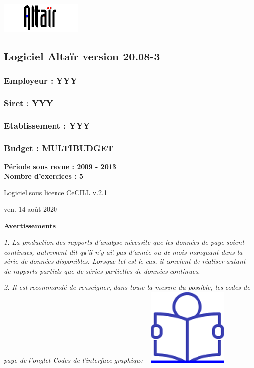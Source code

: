 \includegraphics{icones/altair.png}

\hypertarget{logiciel-altair-version-20.08-3}{%
\subsection{Logiciel Altaïr version
20.08-3}\label{logiciel-altair-version-20.08-3}}

\hypertarget{employeur-yyy}{%
\subsubsection{Employeur : YYY}\label{employeur-yyy}}

\hypertarget{siret-yyy}{%
\subsubsection{Siret : YYY}\label{siret-yyy}}

\hypertarget{etablissement-yyy}{%
\subsubsection{Etablissement : YYY}\label{etablissement-yyy}}

\hypertarget{budget-multibudget}{%
\subsubsection{Budget : MULTIBUDGET}\label{budget-multibudget}}

\textbf{Période sous revue : 2009 - 2013 }\\
\textbf{Nombre d'exercices : 5 }

Logiciel sous licence \href{../Docs/LICENCE.html}{CeCILL v.2.1}

ven. 14 août 2020

\textbf{Avertissements}

\emph{1. La production des rapports d'analyse nécessite que les données
de paye soient continues, autrement dit qu'il n'y ait pas d'année ou de
mois manquant dans la série de données disponibles. Lorsque tel est le
cas, il convient de réaliser autant de rapports partiels que de séries
partielles de données continues.}

\emph{2. Il est recommandé de renseigner, dans toute la mesure du
possible, les codes de paye de l'onglet Codes de l'interface graphique}
~
\href{../Docs/Notices/fiche_onglet_codes.odt}{\includegraphics{icones/Notice.png}}

